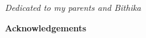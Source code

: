 
\newpage
\thispagestyle{empty}
\begin{flushright}
{\em Dedicated to my parents and Bithika}
\end{flushright}


%

%
\newpage
\begin{center}
{\bf\Large Acknowledgements}
\end{center}


    
\newpage
    \tableofcontents
\newpage
    \listoffigures






%
